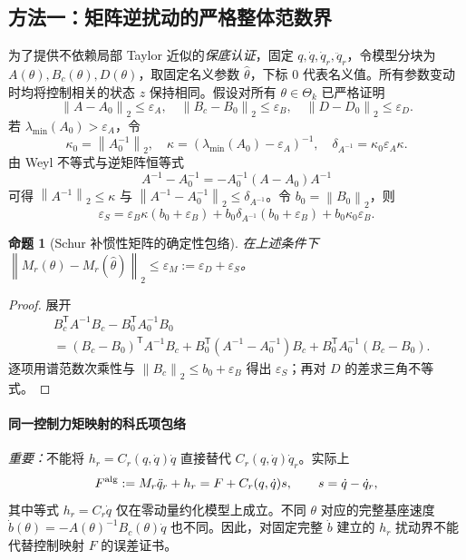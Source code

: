\documentclass[journal,onecolumn]{IEEEtran}
\newtheorem{proposition}{命题}[section]
\newcommand{\norm}[1]{\left\lVert#1\right\rVert}
\newcommand{\tr}{\mathsf T}
\begin{document}
\subsection{方法一：矩阵逆扰动的严格整体范数界}
为了提供不依赖局部 Taylor 近似的\emph{保底认证}，固定 $q,\dot q,\dot q_r,\ddot q_r$，令模型分块为 $A(\theta),B_c(\theta),D(\theta)$，取固定名义参数 $\hat\theta$，下标 $0$ 代表名义值。所有参数变动时均将控制相关的状态 $z$ 保持相同。假设对所有 $\theta\in\Theta_k$ 已严格证明
\begin{equation}
 \norm{A-A_0}_2\le\varepsilon_A,\quad\norm{B_c-B_0}_2\le\varepsilon_B,\quad\norm{D-D_0}_2\le\varepsilon_D.\label{eq:blocks}
\end{equation}
若 $\lambda_{\min}(A_0)>\varepsilon_A$，令
\begin{equation}
 \kappa_0=\norm{A_0^{-1}}_2,\quad\kappa=(\lambda_{\min}(A_0)-\varepsilon_A)^{-1},\quad\delta_{A^{-1}}=\kappa_0\varepsilon_A\kappa.
\end{equation}
由 Weyl 不等式与逆矩阵恒等式
\begin{equation}
 A^{-1}-A_0^{-1}=-A_0^{-1}(A-A_0)A^{-1}
\end{equation}
可得 $\norm{A^{-1}}_2\le\kappa$ 与 $\norm{A^{-1}-A_0^{-1}}_2\le\delta_{A^{-1}}$。令 $b_0=\norm{B_0}_2$，则
\begin{equation}
 \varepsilon_S=\varepsilon_B\kappa(b_0+\varepsilon_B)+b_0\delta_{A^{-1}}(b_0+\varepsilon_B)+b_0\kappa_0\varepsilon_B.\label{eq:epsS}
\end{equation}
\begin{proposition}[Schur 补惯性矩阵的确定性包络]
在上述条件下 $\norm{M_r(\theta)-M_r(\hat\theta)}_2\le\varepsilon_M:=\varepsilon_D+\varepsilon_S$。
\end{proposition}
\begin{proof}
展开
\begin{align*}
&B_c^\tr A^{-1}B_c-B_0^\tr A_0^{-1}B_0\\
&=(B_c-B_0)^\tr A^{-1}B_c+B_0^\tr(A^{-1}-A_0^{-1})B_c+B_0^\tr A_0^{-1}(B_c-B_0).
\end{align*}
逐项用谱范数次乘性与 $\norm{B_c}_2\le b_0+\varepsilon_B$ 得出 $\varepsilon_S$；再对 $D$ 的差求三角不等式。
\end{proof}

\paragraph{同一控制力矩映射的科氏项包络}
\emph{重要：}不能将 $h_r=C_r(q,\dot q)\dot q$ 直接替代 $C_r(q,\dot q)\dot q_r$。实际上
\begin{equation}
 F^{\rm alg}:=M_r\ddot q_r+h_r=F+C_r(q,\dot q)s,\qquad s=\dot q-\dot q_r,\label{eq:mapdiff}
\end{equation}
其中等式 $h_r=C_r\dot q$ 仅在零动量约化模型上成立。不同 $\theta$ 对应的完整基座速度 $\dot b(\theta)=-A(\theta)^{-1}B_c(\theta)\dot q$ 也不同。因此，对固定完整 $\dot b$ 建立的 $h_r$ 扰动界不能代替控制映射 $F$ 的误差证书。
\end{document}
